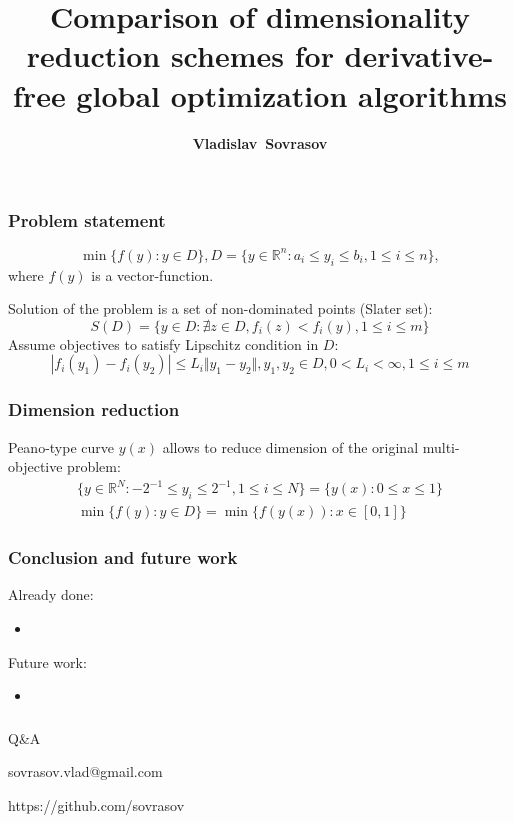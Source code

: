 \documentclass[aspectratio=1610]{beamer}
\title{Comparison of dimensionality reduction schemes for derivative-free global optimization algorithms}
\author{\textbf{Vladislav~Sovrasov}}
\institute{Lobachevsky State University of Nizhni Novgorod}
\date{}
\begin{document}
\begin{frame}
\titlepage
\end{frame}

\begin{frame}
  \begin{center}
  \frametitle{Problem statement}

  \begin{displaymath}
    \min\{f(y): y\in D\}, D=\{y\in \mathbb{R}^n: a_i \leqslant y_i \leqslant b_i, 1\leqslant i \leqslant n \},
  \end{displaymath}
where \(f(y)\) is a vector-function.

\enspace
Solution of the problem is a set of non-dominated points (Slater set):
  \begin{displaymath}
    S(D) = \{y\in D: \nexists z\in D, f_i(z)<f_i(y),1\leqslant i \leqslant m\}
  \end{displaymath}
Assume objectives to satisfy Lipschitz condition in \(D\):
  \begin{displaymath}
    |f_i(y_1)-f_i(y_2)|\leqslant L_i\Vert y_1-y_2\Vert,y_1,y_2\in D,0<L_i<\infty,1\leqslant i\leqslant m
  \end{displaymath}

\end{center}
\end{frame}

\begin{frame}
  \frametitle{Dimension reduction}
  Peano-type curve \(y(x)\) allows to reduce dimension of the original multi-objective problem:
  \begin{gather}
    \lbrace y\in \mathbb{R}^N:-2^{-1}\leqslant y_i\leqslant 2^{-1},1\leqslant i\leqslant N\rbrace=\{y(x):0\leqslant x\leqslant 1\} \nonumber \\
    \min\{f(y): y\in D\}=\min\{f(y(x)): x\in [0,1]\} \nonumber
  \end{gather}

\end{frame}

\begin{frame}
  \frametitle{Conclusion and future work}
    Already done:
    \begin{itemize}
      \item
    \end{itemize}
    Future work:
    \begin{itemize}
      \item
    \end{itemize}
\end{frame}

\begin{frame}{{}}
  \frametitle{ }
  \begin{center}
    \Large{Q\&A}

\vspace{1cm}

    sovrasov.vlad@gmail.com

    https://github.com/sovrasov
  \end{center}
\end{frame}
\end{document}
